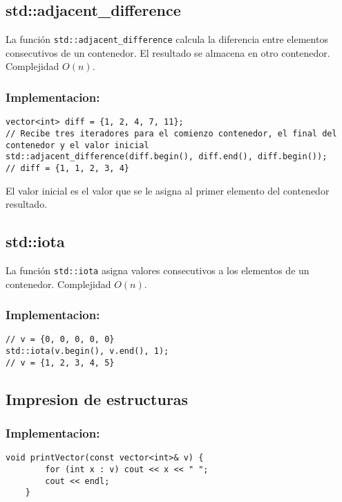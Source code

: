 \subsection{std::adjacent\_difference}
\label{subsec:std_adjacent_difference}
La función \texttt{std::adjacent\_difference} calcula la diferencia entre elementos consecutivos de un contenedor. El resultado se almacena en otro contenedor. Complejidad $O(n)$.

\subsubsection{Implementacion:}
\begin{lstlisting}
vector<int> diff = {1, 2, 4, 7, 11};
// Recibe tres iteradores para el comienzo contenedor, el final del contenedor y el valor inicial
std::adjacent_difference(diff.begin(), diff.end(), diff.begin());
// diff = {1, 1, 2, 3, 4}
\end{lstlisting}

El valor inicial es el valor que se le asigna al primer elemento del contenedor resultado.

\subsection{std::iota}
\label{subsec:std_iota}
La función \texttt{std::iota} asigna valores consecutivos a los elementos de un contenedor. Complejidad $O(n)$. 

\subsubsection{Implementacion:}
\begin{lstlisting}
// v = {0, 0, 0, 0, 0}
std::iota(v.begin(), v.end(), 1);
// v = {1, 2, 3, 4, 5}
\end{lstlisting}

\subsection{Impresion de estructuras}

\subsubsection{Implementacion:}
    \begin{lstlisting}[style=cpp]
    void printVector(const vector<int>& v) {
        for (int x : v) cout << x << " ";
        cout << endl;
    }
    \end{lstlisting}
